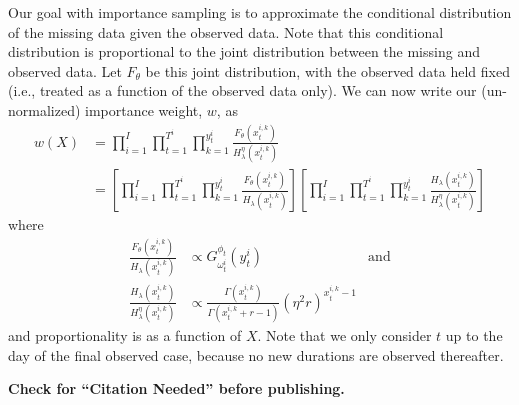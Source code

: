 \documentclass[11pt, oneside]{article}   	%
\begin{document}
\begin{appendices}
	Our goal with importance sampling is to approximate the conditional distribution of the missing data given the observed data. Note that this conditional distribution is proportional to the joint distribution between the missing and observed data. Let $F_\theta$ be this joint distribution, with the observed data held fixed (i.e., treated as a function of the observed data only). We can now write our (un-normalized) importance weight, $w$, as
	\begin{align}
		w(X) &= \prod_{i=1}^{I} \prod_{t=1}^{T^i} \prod_{k=1}^{y_t^i} \frac{F_\theta(x_t^{i,k})}{H_\lambda^\eta(x_t^{i,k})}\\
		&= \left[ \prod_{i=1}^{I} \prod_{t=1}^{T^i} \prod_{k=1}^{y_t^i} \frac{F_\theta(x_t^{i,k})}{H_\lambda(x_t^{i,k})} \right] \left[ \prod_{i=1}^{I} \prod_{t=1}^{T^i} \prod_{k=1}^{y_t^i} \frac{H_\lambda(x_t^{i,k})}{H_\lambda^\eta(x_t^{i,k})} \right]
	\end{align}
		where
	\begin{align}
		\frac{F_\theta(x_t^{i,k})}{H_\lambda(x_t^{i,k})} & \propto G_{\omega_t^i}^{\phi_t}(y_t^i) & \mathrm{and}\\
		\frac{H_\lambda(x_t^{i,k})}{H_\lambda^\eta(x_t^{i,k})} & \propto \frac{\Gamma(x_t^{i,k})}{\Gamma(x_t^{i,k} + r - 1)} \left( \eta^2 r \right)^{x_t^{i,k} - 1}
	\end{align}
	and proportionality is as a function of $X$. Note that we only consider $t$ up to the day of the final observed case, because no new durations are observed thereafter.

\end{appendices}





\textbf{Check for ``Citation Needed'' before publishing.}



\end{document}
